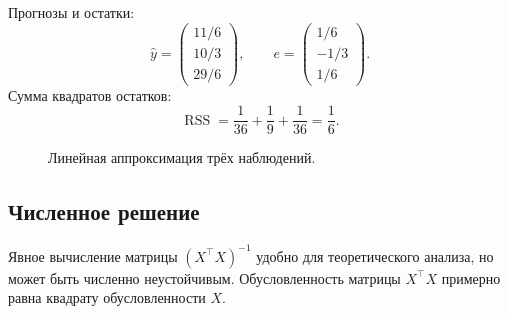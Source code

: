\documentclass[12pt,a4paper]{article}
\theoremstyle{definition}
\theoremstyle{remark}
\begin{document}
Прогнозы и остатки:
\[
    \widehat y=
    \begin{pmatrix}
        11/6\\10/3\\29/6
    \end{pmatrix},
    \qquad
    e=
    \begin{pmatrix}
        1/6\\-1/3\\1/6
    \end{pmatrix}.
\]
Сумма квадратов остатков:
\[
    \operatorname{RSS}
    =
    \frac{1}{36}+\frac{1}{9}+\frac{1}{36}
    =
    \frac{1}{6}.
\]

\begin{figure}[ht]
\centering
{}
\caption{Линейная аппроксимация трёх наблюдений.}
\end{figure}

\subsection{Численное решение}

Явное вычисление матрицы $(X^\top X)^{-1}$ удобно для теоретического
анализа, но может быть численно неустойчивым. Обусловленность матрицы
$X^\top X$ примерно равна квадрату обусловленности $X$.
\end{document}
